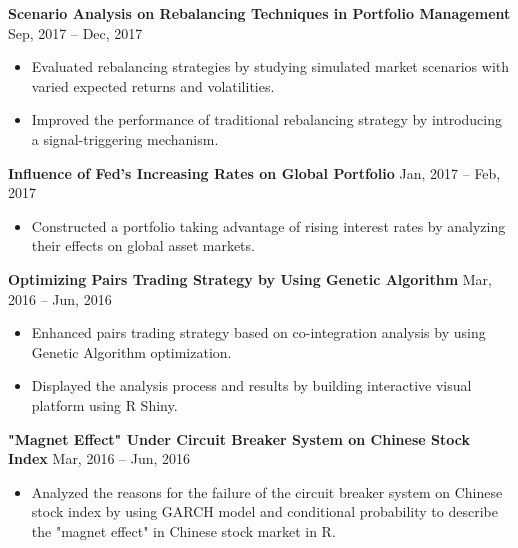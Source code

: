\documentclass[a4paper,12pt]{report}
\newcommand{\marginAdj}{0.5in}
\begin{document}
\noindent
\textbf{Scenario Analysis on Rebalancing Techniques in Portfolio Management }  \hspace*{\marginAdj}  \hspace*{0.35in} {\fontsize{10pt}{10pt}\selectfont Sep, 2017 – Dec, 2017} \par
\noindent 
\begin{itemize}[noitemsep,topsep=0pt]
	\item {\fontsize{10pt}{10pt}\selectfont Evaluated rebalancing strategies by studying simulated market scenarios with varied expected returns and volatilities.} \par
	\item {\fontsize{10pt}{10pt}\selectfont Improved the performance of traditional rebalancing strategy by introducing a signal-triggering mechanism.} \par
\end{itemize}

\noindent 
\textbf{Influence of Fed's Increasing Rates on Global Portfolio}  \hspace*{\marginAdj}  \hspace*{1.55in} {\fontsize{10pt}{10pt}\selectfont Jan, 2017 – Feb, 2017} \par
\noindent 
\begin{itemize}[noitemsep,topsep=0pt]
\item {\fontsize{10pt}{10pt}\selectfont Constructed a portfolio taking advantage of rising interest rates by analyzing their effects on global asset markets.} \par
\end{itemize}

\noindent 
\textbf{Optimizing Pairs Trading Strategy by Using Genetic Algorithm} \hspace*{0.95in}  \hspace*{\marginAdj} {\fontsize{10pt}{10pt}\selectfont  Mar, 2016 – Jun, 2016} \par
\noindent 
\begin{itemize}[noitemsep,topsep=0pt]
\item {\fontsize{10pt}{10pt}\selectfont Enhanced pairs trading strategy based on co-integration analysis by using Genetic Algorithm optimization.}
\item {\fontsize{10pt}{10pt}\selectfont Displayed the analysis process and results by building interactive visual platform using R Shiny.}
\end{itemize}

\noindent 
\textbf{"Magnet Effect" Under Circuit Breaker System on Chinese Stock Index} \hspace*{0.35in}\hspace*{\marginAdj} {\fontsize{10pt}{10pt}\selectfont Mar, 2016 – Jun, 2016} \par
\noindent 
\begin{itemize}[noitemsep,topsep=0pt]
	\item {\fontsize{10pt}{10pt}\selectfont Analyzed the reasons for the failure of the circuit breaker system on Chinese stock index by using GARCH model and conditional probability to describe the "magnet effect" in Chinese stock market in R.} \par
\end{itemize}
\end{document}
